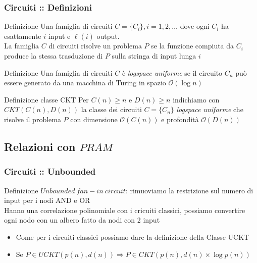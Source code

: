 \documentclass{beamer}
\newcommand{\bigO}{\ensuremath{\mathcal{O}}} %
\begin{document}
\begin{frame}
	\frametitle{Circuiti :: Definizioni} %
	
	\begin{block}{Definizione}
		Una famiglia di circuiti $C = \{C_i\}, i=1,2,\dots$ dove ogni $C_i$ ha esattamente $i$ input e $\ell(i)$ output.\\
		La famiglia $C$ di circuiti risolve un problema $P$ se la funzione compiuta da $C_i$ produce la stessa trasduzione di $P$ sulla stringa di input lunga $i$
	\end{block}
	\begin{block}{Definizione}
		Una famiglia di circuiti $C$ è \emph{logspace uniforme} se il circuito $C_n$ può essere generato da una macchina di Turing in spazio $\bigO{(\log n)}$
	\end{block}
	\begin{block}{Definizione classe CKT}
		Per $C(n) \geq n$ e $D(n) \geq n$ indichiamo con $CKT(C(n),D(n))$ la classe dei circuiti $C = \{C_n\}$ \emph{logspace uniforme} che risolve il problema $P$ con dimensione $\bigO{(C(n))}$ e profondità $\bigO{(D(n))}$
	\end{block}
\end{frame}


\subsection{Relazioni con $PRAM$}

\begin{frame}
	\frametitle{Circuiti :: Unbounded} %
	\begin{block}{Definizione}
		$Unbounded\ fan-in\ circuit $: rimuoviamo la restrizione sul numero di input per i nodi AND e OR\\
		Hanno una correlazione polinomiale con i cricuiti classici, possiamo convertire ogni nodo con un albero fatto da nodi con 2 input
	\end{block}
	\begin{itemize}
		\item Come per i circuiti classici possiamo dare la definizione della Classe UCKT
		\item Se $P \in UCKT(p(n),d(n)) \Longrightarrow P \in CKT(p(n),d(n) \times \log p(n))$
	\end{itemize}
\end{frame}
\end{document}

